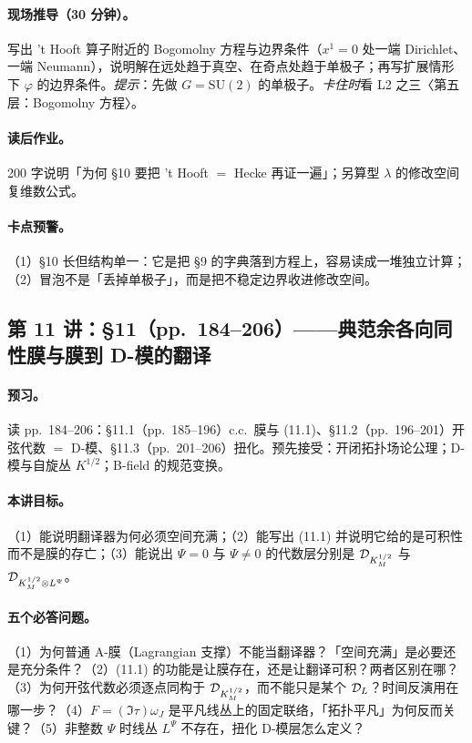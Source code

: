 {\paragraph{现场推导（30 分钟）。}写出 't Hooft 算子附近的 Bogomolny 方程与边界条件（\(x^{1}=0\) 处一端 Dirichlet、一端 Neumann），说明解在远处趋于真空、在奇点处趋于单极子；再写扩展情形下 \(\varphi\) 的边界条件。\emph{提示}：先做 \(G=\mathrm{SU}(2)\) 的单极子。\emph{卡住时}看 L2 之三〈第五层：Bogomolny 方程〉。\pC

\paragraph{读后作业。}200 字说明「为何 §10 要把 't Hooft \(=\) Hecke 再证一遍」；另算型 \(\lambda\) 的修改空间复维数公式。\pC

\paragraph{卡点预警。}（1）§10 长但结构单一：它是把 §9 的字典落到方程上，容易读成一堆独立计算；（2）冒泡不是「丢掉单极子」，而是把不稳定边界收进修改空间。\pC

\subsection{第 11 讲：\S11（pp.~184--206）——典范余各向同性膜与膜到 D-模的翻译}

\paragraph{预习。}读 pp.~184--206：§11.1（pp.~185--196）c.c.\ 膜与 (11.1)、§11.2（pp.~196--201）开弦代数 \(=\) D-模、§11.3（pp.~201--206）扭化。预先接受：开闭拓扑场论公理；D-模与自旋丛 \(K^{1/2}\)；B-field 的规范变换。\pC

\paragraph{本讲目标。}（1）能说明翻译器为何必须空间充满；（2）能写出 (11.1) 并说明它给的是可积性而不是膜的存亡；（3）能说出 \(\Psi=0\) 与 \(\Psi\neq0\) 的代数层分别是 \(\mathcal{D}_{K_M^{1/2}}\) 与 \(\mathcal{D}_{K_M^{1/2}\otimes L^{\Psi}}\)。\pC

\paragraph{五个必答问题。}（1）为何普通 A-膜（Lagrangian 支撑）不能当翻译器？「空间充满」是必要还是充分条件？（2）(11.1) 的功能是让膜存在，还是让翻译可积？两者区别在哪？（3）为何开弦代数必须逐点同构于 \(\mathcal{D}_{K_M^{1/2}}\)，而不能只是某个 \(\mathcal{D}_L\)？时间反演用在哪一步？（4）\(F=(\Im\tau)\omega_J\) 是平凡线丛上的固定联络，「拓扑平凡」为何反而关键？（5）非整数 \(\Psi\) 时线丛 \(L^{\Psi}\) 不存在，扭化 D-模层怎么定义？\pC

}
